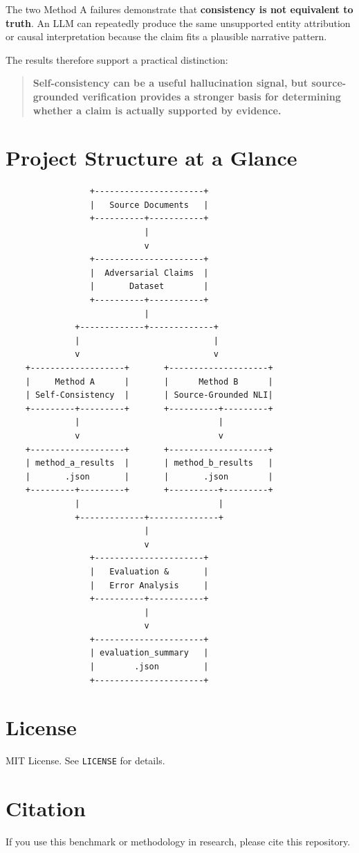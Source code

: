 \documentclass[11pt,a4paper]{article}
\begin{document}
The two Method A failures demonstrate that \textbf{consistency is not equivalent to truth}. An LLM can repeatedly produce the same unsupported entity attribution or causal interpretation because the claim fits a plausible narrative pattern.

The results therefore support a practical distinction:

\begin{quote}
\textbf{Self-consistency can be a useful hallucination signal, but source-grounded verification provides a stronger basis for determining whether a claim is actually supported by evidence.}
\end{quote}


\section{Project Structure at a Glance}

\begin{lstlisting}
                 +----------------------+
                 |   Source Documents   |
                 +----------+-----------+
                            |
                            v
                 +----------------------+
                 |  Adversarial Claims  |
                 |       Dataset        |
                 +----------+-----------+
                            |
              +-------------+-------------+
              |                           |
              v                           v
    +-------------------+       +--------------------+
    |     Method A      |       |      Method B      |
    | Self-Consistency  |       | Source-Grounded NLI|
    +---------+---------+       +----------+---------+
              |                            |
              v                            v
    +-------------------+       +--------------------+
    | method_a_results  |       | method_b_results   |
    |       .json       |       |       .json        |
    +---------+---------+       +----------+---------+
              |                            |
              +-------------+--------------+
                            |
                            v
                 +----------------------+
                 |   Evaluation &       |
                 |   Error Analysis     |
                 +----------+-----------+
                            |
                            v
                 +----------------------+
                 | evaluation_summary   |
                 |        .json         |
                 +----------------------+
\end{lstlisting}


\section*{License}

MIT License. See \texttt{LICENSE} for details.

\section*{Citation}

If you use this benchmark or methodology in research, please cite this repository.
\end{document}
